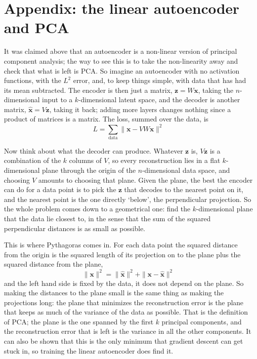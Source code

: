 \documentclass[12pt]{article}
\begin{document}
\section*{Appendix: the linear autoencoder and PCA}

It was claimed above that an autoencoder is a non-linear version of
principal component analysis; the way to see this is to take the
non-linearity away and check that what is left is PCA. So imagine an
autoencoder with no activation functions, with the $L^2$ error, and,
to keep things simple, with data that has had its mean subtracted. The
encoder is then just a matrix, $\mathbf{z}=W\mathbf{x}$, taking the
$n$-dimensional input to a $k$-dimensional latent space, and the
decoder is another matrix, $\hat{\mathbf{x}}=V\mathbf{z}$, taking it
back; adding more layers changes nothing since a product of matrices
is a matrix. The loss, summed over the data, is
\begin{equation}
  L=\sum_{\text{data}}\|\mathbf{x}-VW\mathbf{x}\|^2
\end{equation}

Now think about what the decoder can produce. Whatever $\mathbf{z}$
is, $V\mathbf{z}$ is a combination of the $k$ columns of $V$, so every
reconstruction lies in a flat $k$-dimensional plane through the origin
of the $n$-dimensional data space, and choosing $V$ amounts to
choosing that plane. Given the plane, the best the encoder can do for
a data point is to pick the $\mathbf{z}$ that decodes to the nearest
point on it, and the nearest point is the one directly `below', the
perpendicular projection. So the whole problem comes down to a
geometrical one: find the $k$-dimensional plane that the data lie
closest to, in the sense that the sum of the squared perpendicular
distances is as small as possible.

This is where Pythagoras comes in. For each data point the squared
distance from the origin is the squared length of its projection on to
the plane plus the squared distance from the plane,
\begin{equation}
  \|\mathbf{x}\|^2=\|\hat{\mathbf{x}}\|^2+\|\mathbf{x}-\hat{\mathbf{x}}\|^2
\end{equation}
and the left hand side is fixed by the data, it does not depend on the
plane. So making the distances to the plane small is the same thing as
making the projections long: the plane that minimizes the
reconstruction error is the plane that keeps as much of the variance
of the data as possible. That is the definition of PCA; the plane is
the one spanned by the first $k$ principal components, and the
reconstruction error that is left is the variance in all the other
components. It can also be shown that this is the only minimum that
gradient descent can get stuck in, so training the linear autoencoder
does find it.
\end{document}
